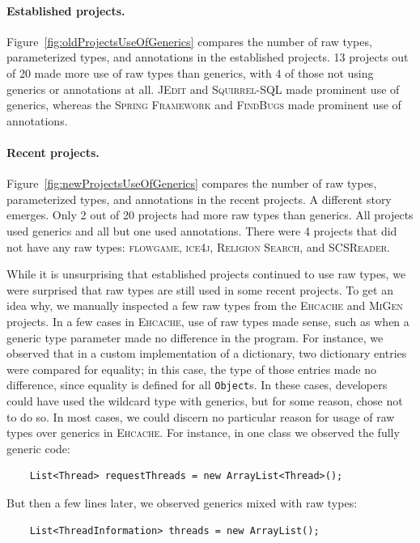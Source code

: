 \documentclass{svjour3}
\newcommand{\code}[1]{\texttt{#1}}
\newcommand{\squirrelsql}{\textsc{Squirrel-SQL}\xspace}
\newcommand{\jedit}{\textsc{JEdit}\xspace}
\newcommand{\spring}{the \textsc{Spring Framework}\xspace}
\newcommand{\findbugs}{\textsc{FindBugs}\xspace}
\newcommand{\ehcache}{\textsc{Ehcache}\xspace}
\newcommand{\flowgame}{\textsc{flowgame}\xspace}
\newcommand{\ice}{\textsc{ice4j}\xspace}
\newcommand{\migen}{\textsc{MiGen}\xspace}
\newcommand{\scsreader}{\textsc{SCSReader}\xspace}
\newcommand{\religion}{\textsc{Religion Search}\xspace}
\begin{document}
\paragraph{Established projects.}Figure~\ref{fig:oldProjectsUseOfGenerics} compares the number of raw types, parameterized types, and annotations in the established projects.  
13 projects out of 20 made more use of raw types than generics, with 4 of those not using generics or annotations at all.  
\jedit and \squirrelsql made prominent use of generics, whereas \spring and \findbugs made prominent use of annotations.

\paragraph{Recent projects.}Figure~\ref{fig:newProjectsUseOfGenerics} compares the number of raw types, parameterized types, and annotations in the recent projects.  
A different story emerges.  Only 2 out of 20 projects had more raw types than generics.  All projects used generics and all but one used annotations.
There were 4 projects that did not have any raw types: 
\flowgame, \ice, \religion, and \scsreader.

While it is unsurprising that established projects continued to use raw types, 
we were surprised that raw types are still used in some recent projects.
To get an idea why, we manually inspected a few raw types from the 
\ehcache and \migen projects.
In a few cases in \ehcache, use of raw types made sense, such as when a generic 
type parameter made no difference in the program.
For instance, we observed that in a custom implementation of a 
dictionary, two dictionary entries were compared for equality; in this case,
the type of those entries made no difference, since equality is
defined for all \code{Object}s.
In these cases, developers could have used the wildcard type with generics,
but for some reason, chose not to do so.
In most cases, we could discern no particular reason for usage of raw types
over generics in \ehcache.
For instance, in one class we observed the fully generic code:

\begin{lstlisting}
	List<Thread> requestThreads = new ArrayList<Thread>();
\end{lstlisting}

\noindent
But then a few lines later, we observed generics mixed with raw types:

\begin{lstlisting}
	List<ThreadInformation> threads = new ArrayList();
\end{lstlisting}
\end{document}
